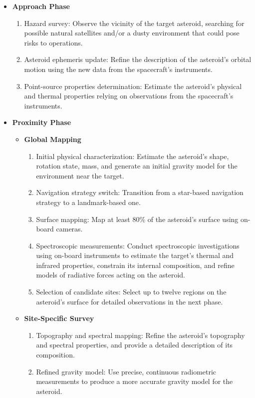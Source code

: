 \documentclass{Configuration_gigi/PoliMi3i_thesis}
\begin{document}
\begin{itemize}
    \item \textbf{Approach Phase}
    \begin{enumerate}
        \item Hazard survey: Observe the vicinity of the target asteroid, searching for possible natural satellites and/or a dusty environment that could pose risks to operations.
        \item Asteroid ephemeris update: Refine the description of the asteroid's orbital motion using the new data from the spacecraft's instruments.
        \item Point-source properties determination: Estimate the asteroid's physical and thermal properties relying on observations from the spacecraft's instruments.
    \end{enumerate}
    \item \textbf{Proximity Phase}
    \begin{itemize}
        \item \textbf{Global Mapping}
        \begin{enumerate}
            \item Initial physical characterization: Estimate the asteroid's shape, rotation state, mass, and generate an initial gravity model for the environment near the target.
            \item Navigation strategy switch: Transition from a star-based navigation strategy to a landmark-based one.
            \item Surface mapping: Map at least 80\% of the asteroid's surface using on-board cameras.
            \item Spectroscopic measurements: Conduct spectroscopic investigations using on-board instruments to estimate the target's thermal and infrared properties, constrain its internal composition, and refine models of radiative forces acting on the asteroid.
            \item Selection of candidate sites: Select up to twelve regions on the asteroid's surface for detailed observations in the next phase.
        \end{enumerate}
        \item \textbf{Site-Specific Survey}
        \begin{enumerate}
            \item Topography and spectral mapping: Refine the asteroid’s topography and spectral properties, and provide a detailed description of its composition.
            \item Refined gravity model: Use precise, continuous radiometric measurements to produce a more accurate gravity model for the asteroid.

\end{enumerate}
\end{itemize}
\end{itemize}
\end{document}

